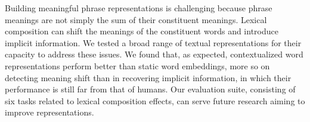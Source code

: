 Building meaningful phrase representations is challenging because phrase meanings are not simply the sum of their constituent meanings. Lexical composition can shift the meanings of the constituent words and introduce implicit information. We tested a broad range of textual representations for their capacity to address these issues. We found that, as expected, contextualized word representations perform better than static word embeddings, more so on detecting meaning shift than in recovering implicit information, in which their performance is still far from that of humans. Our evaluation suite, consisting of six tasks related to lexical composition effects, can serve future research aiming to improve representations.